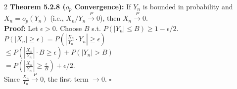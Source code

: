 \documentclass{article}
\newcommand{\distname}[1]{\textbf{#1}}
\begin{document}
\begin{multicols*}{2}
\distname{Theorem 5.2.8 ($o_p$ Convergence):}
If $Y_n$ is bounded in probability and $X_n = o_p(Y_n)$ (i.e., $X_n/Y_n \xrightarrow{P} 0$), then $X_n \xrightarrow{P} 0$.
\\ \textbf{Proof:} Let $\epsilon > 0$. Choose $B$ s.t. $P(|Y_n| \le B) \ge 1 - \epsilon/2$.
\\ $P(|X_n| \ge \epsilon) = P(|\frac{X_n}{Y_n} \cdot Y_n| \ge \epsilon)$
\\ $\le P(|\frac{X_n}{Y_n}| \cdot B \ge \epsilon) + P(|Y_n| > B)$
\\ $= P(|\frac{X_n}{Y_n}| \ge \frac{\epsilon}{B}) + \epsilon/2$.
\\ Since $\frac{X_n}{Y_n} \xrightarrow{P} 0$, the first term $\to 0$. \hfill $\square$
\end{multicols*}
\end{document}
